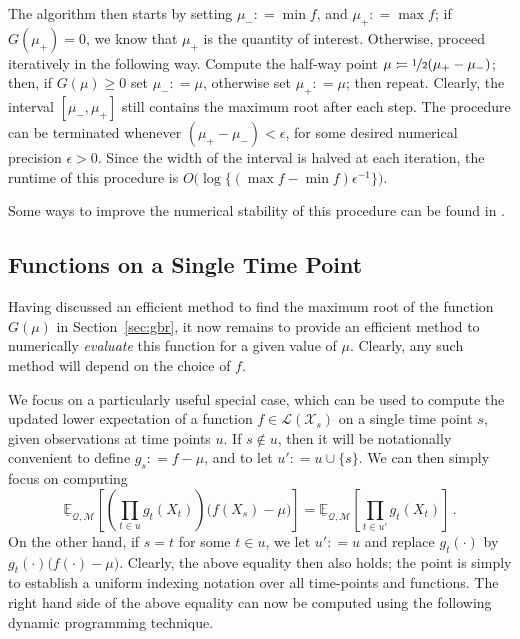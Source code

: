 \documentclass[twoside,11pt]{article}
\newcommand{\states}{\mathcal{X}}
\newcommand{\lexp}{\underline{\mathbb{E}}_{\rateset,\mathcal{M}}}
\newcommand{\gambles}{\mathcal{L}}
\newcommand{\rateset}{\mathcal{Q}}
\newcommand{\coloneqq}{:\!=}
\begin{document}
The algorithm then starts by setting $\mu_-\coloneqq \min f$, and $\mu_+\coloneqq \max f$; if $G(\mu_+)=0$, we know that $\mu_+$ is the quantity of interest. Otherwise, proceed iteratively in the following way. Compute the half-way point $\mu\coloneqq \nicefrac{1}{2}(\mu_+-\mu_-)$; then, if $G(\mu)\geq 0$ set $\mu_-\coloneqq \mu$, otherwise set $\mu_+\coloneqq\mu$; then repeat. Clearly, the interval $[\mu_-,\mu_+]$ still contains the maximum root after each step. The procedure can be terminated whenever $(\mu_+-\mu_-)<\epsilon$, for some desired numerical precision $\epsilon>0$. Since the width of the interval is halved at each iteration, the runtime of this procedure is $O\bigl(\log\{(\max f - \min f)\epsilon^{-1}\}\bigr)$.

Some ways to improve the numerical stability of this procedure can be found in \cite[Section 2.7.3]{de2015credal}. %

\subsection{Functions on a Single Time Point}\label{sec:funcs_single_time}

Having discussed an efficient method to find the maximum root of the function $G(\mu)$ in Section~\ref{sec:gbr}, it now remains to provide an efficient method to numerically \emph{evaluate} this function for a given value of $\mu$. Clearly, any such method will depend on the choice of $f$.

We focus on a particularly useful special case, which can be used to compute the updated lower expectation of a function $f\in\gambles(\states_s)$ on a single time point $s$, given observations at time points $u$. If $s\notin u$, then it will be notationally convenient to define $g_s\coloneqq f - \mu$, and to let $u'\coloneqq u\cup \{s\}$. We can then simply focus on computing
\begin{equation*}
\lexp\left[ \left(\prod_{t\in u}g_{t}(X_{t})\right)\bigl(f(X_s) - \mu\bigr) \right] = \lexp\left[ \prod_{t\in u'}g_{t}(X_{t})\right]\,.
\end{equation*}
On the other hand, if $s = t$ for some $t\in u$, we let $u'\coloneqq u$ and replace $g_{t}(\cdot)$ by $g_{t}(\cdot)\bigl(f(\cdot)-\mu\bigr)$. Clearly, the above equality then also holds; the point is simply to establish a uniform indexing notation over all time-points and functions. The right hand side of the above equality can now be computed using the following dynamic programming technique. 
\end{document}
